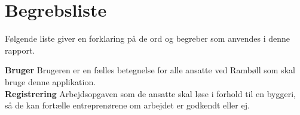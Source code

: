 \section{Begrebsliste}
Følgende liste giver en forklaring på de ord og begreber som anvendes i denne rapport.

\textbf{Bruger}
\indent Brugeren er en fælles betegnelse for alle ansatte ved Rambøll som skal bruge denne applikation. \\

\textbf{Registrering}
\indent Arbejdsopgaven som de ansatte skal løse i forhold til en byggeri, så de kan fortælle entreprenørene om arbejdet er godkendt eller ej. \\